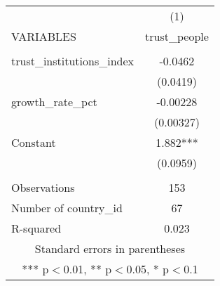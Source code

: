 \documentclass[]{article}
\begin{document}
\begin{tabular}{lc} \hline
 & (1) \\
VARIABLES & trust\_people \\ \hline
 &  \\
trust\_institutions\_index & -0.0462 \\
 & (0.0419) \\
growth\_rate\_pct & -0.00228 \\
 & (0.00327) \\
Constant & 1.882*** \\
 & (0.0959) \\
 &  \\
Observations & 153 \\
Number of country\_id & 67 \\
 R-squared & 0.023 \\ \hline
\multicolumn{2}{c}{ Standard errors in parentheses} \\
\multicolumn{2}{c}{ *** p$<$0.01, ** p$<$0.05, * p$<$0.1} \\
\end{tabular}
\end{document}
